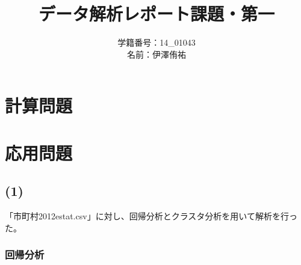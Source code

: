 \documentclass[a4paper, 11pt]{jsarticle}
\title{データ解析レポート課題・第一}
\author{学籍番号：14\_01043 \\ 名前：伊澤侑祐}
\date{}
\begin{document}
\maketitle

\section{計算問題}

\section{応用問題}

\subsection*{(1)}
「市町村2012estat.csv」に対し、回帰分析とクラスタ分析を用いて解析を行った。

\subsubsection{回帰分析}
\end{document}
